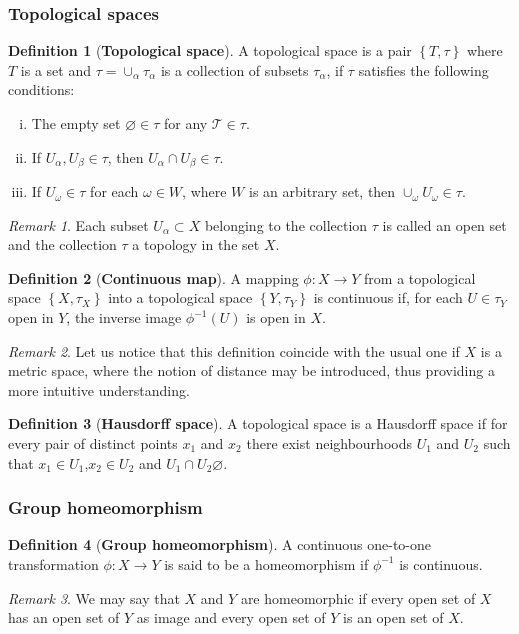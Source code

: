 \documentclass[12pt,a4paper]{report}
\theoremstyle{definition}
\newtheorem{definition}{Definition}
\theoremstyle{remark}
\newtheorem*{remark}{Remark}
\theoremstyle{remark}
\begin{document}
\subsubsection{Topological spaces}
\begin{definition}[\textbf{Topological space}]
A topological space is a pair $\left\lbrace T,\tau\right\rbrace$ where $T$ is a set and $\tau=\cup_\alpha\tau_\alpha$ is a collection of subsets $\tau_\alpha$, if $\tau$ satisfies the following conditions:
\begin{enumerate}[i.]
\item The empty set $\varnothing\in\tau$ for any $\mathcal{T}\in\tau$.
\item If $U_\alpha,U_\beta\in\tau$, then $U_\alpha\cap U_\beta\in\tau$.
\item If $U_\omega\in\tau$ for each $\omega\in W$, where $W$ is an arbitrary set, then $\cup_\omega U_\omega\in\tau$.
\end{enumerate}
\end{definition}
\begin{remark} Each subset $U_\alpha\subset X$ belonging to the collection $\tau$ is called an open set and the collection $\tau$ a topology in the set $X$. 
\end{remark}
\begin{definition}[\textbf{Continuous map}]
A mapping $\phi:X\rightarrow Y$ from a topological space $\left\lbrace X,\tau_X\right\rbrace$ into a topological space $\left\lbrace Y,\tau_Y\right\rbrace$ is continuous if, for each $U\in\tau_Y$ open in $Y$, the inverse image $\phi^{-1}(U)$ is open in $X$.
\end{definition}
\begin{remark}Let us notice that this definition coincide with the usual one if $X$ is a metric space, where the notion of distance may be introduced, thus providing a more intuitive understanding.
\end{remark}
\begin{definition}[\textbf{Hausdorff space}]
A topological space is a Hausdorff space if for every pair of distinct points $x_1$ and $x_2$ there exist neighbourhoods $U_1$ and $U_2$ such that $x_1\in U_1$,$x_2\in U_2$ and $U_1\cap U_2\varnothing$.
\end{definition}

\subsubsection{Group homeomorphism}
\begin{definition}[\textbf{Group homeomorphism}]
A continuous one-to-one transformation $\phi:X\rightarrow Y$ is said to be a homeomorphism if $\phi^{-1}$ is continuous. 
\end{definition}
\begin{remark}
We may say that $X$ and $Y$ are homeomorphic if every open set of $X$ has an open set of $Y$ as image and every open set of $Y$ is an open set of $X$. 
\end{remark}
\end{document}
